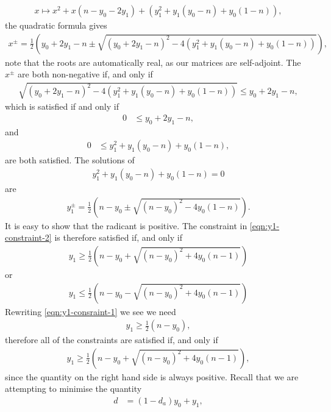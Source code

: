 \begin{align}
  x\mapsto x^2 + x(n-y_0 -2y_1) + \left(y_1^2 + y_1(y_0-n) + y_0(1-n)\right),
\end{align}
the quadratic formula gives
\begin{align}
  x^\pm = \frac{1}{2}\left(y_0 +2y_1 -n \pm \sqrt{(y_0 + 2y_1 -n)^2 - 4(y_1^2 + y_1(y_0-n) + y_0(1-n))} \right),
\end{align}
note that the roots are automatically real, as our matrices are self-adjoint. The $x^\pm$ are both non-negative if, and only if
\begin{align}
  \sqrt{(y_0 + 2y_1 -n)^2 - 4(y_1^2 + y_1(y_0-n) + y_0(1-n))} \leq y_0 +2y_1 -n,
\end{align}
which is satisfied if and only if
\begin{align}
  0&\leq y_0 +2y_1 -n,
     \label{eqn:y1-consraint-1}
\end{align}
and
\begin{align}
 0&\leq y_1^2 + y_1(y_0-n) + y_0(1-n),
    \label{eqn:y1-constraint-2}
\end{align}
are both satisfied. The solutions of
\begin{align}
  y_1^2 + y_1(y_0-n) + y_0(1-n) = 0
\end{align}
are
\begin{align}
  y_1^\pm = \frac{1}{2}\left(n-y_0 \pm \sqrt{(n-y_0)^2 - 4y_0(1-n)}\right).
\end{align}
It is easy to show that the radicant is positive. The constraint in \eqref{eqn:y1-constraint-2} is therefore satisfied if, and only if
\begin{align}
  y_1 \geq \frac{1}{2}\left(n-y_0 + \sqrt{(n-y_0)^2 + 4y_0(n-1)}\right)
\end{align}
or
\begin{align}
  y_1 \leq \frac{1}{2}\left(n-y_0 - \sqrt{(n-y_0)^2 + 4y_0(n-1)}\right)
\end{align}
Rewriting \eqref{eqn:y1-consraint-1} we see we need
\begin{align}
  y_1 \geq \frac{1}{2}\left(n-y_0\right),
\end{align}
therefore all of the constraints are satisfied if, and only if
\begin{align}
  y_1 \geq \frac{1}{2}\left(n-y_0 + \sqrt{(n-y_0)^2 + 4y_0(n-1)}\right),
\end{align}
since the quantity on the right hand side is always positive. Recall that we are attempting to minimise the quantity
\begin{align}
  d &= (1-d_a)y_0 + y_1,
\end{align}
